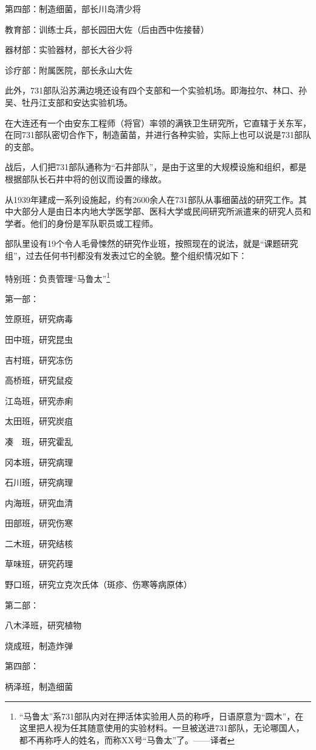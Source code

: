 \documentclass[a4paper,12pt,UTF8,twoside]{ctexbook}
\begin{document}
第四部：制造细菌，部长川岛清少将

教育部：训练士兵，部长园田大佐（后由西中佐接替）

器材部：实验器材，部长大谷少将

诊疗部：附属医院，部长永山大佐

此外，731部队沿苏满边境还设有四个支部和一个实验机场。即海拉尔、林口、孙吴、牡丹江支部和安达实验机场。

在大连还有一个由安东工程师（将官）率领的满铁卫生研究所，它直辖于关东军，在同731部队密切合作下，制造菌苗，并进行各种实验，实际上也可以说是731部队的支部。

战后，人们把731部队通称为“石井部队”，是由于这里的大规模设施和组织，都是根据部队长石井中将的创议而设置的缘故。

从1939年建成一系列设施起，约有2600余人在731部队从事细菌战的研究工作。其中大部分人是由日本内地大学医学部、医科大学或民间研究所派遣来的研究人员和学者。他们的身份是军队职员或工程师。

部队里设有19个令人毛骨悚然的研究作业班，按照现在的说法，就是“课题研究组”，过去任何书刊都没有发表过它的全貌。整个组织情况如下：

特别班：负责管理“马鲁太”\footnote{“马鲁太”系731部队内对在押活体实验用人员的称呼，日语原意为“圆木”，在这里把人视为任其随意使用的实验材料。一旦被送进731部队，无论哪国人，都不再称呼人的姓名，而称XX号“马魯太”了。——译者}

第一部：

笠原班，研究病毒

田中班，研究昆虫

吉村班，研究冻伤

高桥班，研究鼠疫

江岛班，研究赤痢

太田班，研究炭疽

凑　班，研究霍乱

冈本班，研究病理

石川班，研究病理

内海班，研究血清

田部班，研究伤寒

二木班，研究结核

草味班，研究药理

野口班，研究立克次氏体（斑疹、伤寒等病原体）

第二部：

八木泽班，研究植物

烧成班，制造炸弹

第四部：

柄泽班，制造细菌
\end{document}
